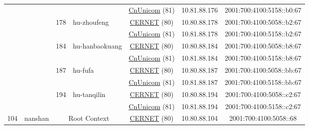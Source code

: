 \begin{small}
\begin{center}
\begin{longtable}{|c|c|c|c|c|c|c|c|}
  &  &  &  & \multicolumn{2}{|c|}{\tiny{\href{http://www.chinaunicom.com}{CnUnicom} (81)}} & \tiny{10.81.88.176} & \tiny{2001:700:4100:5158::b0:67} \\* \cline{3-3}\cline{4-4}\cline{5-5}\cline{6-6}\cline{7-7}\cline{8-8}
  &  & \multirow{2}{*}{\tiny{178}} & \multicolumn{1}{|l|}{\multirow{2}{*}{\tiny{hu-zhoufeng}}} & \multicolumn{2}{|c|}{\tiny{\href{http://www.cernet.edu.cn}{CERNET} (80)}} & \tiny{10.80.88.178} & \tiny{2001:700:4100:5058::b2:67} \\* \cline{5-5}\cline{6-6}\cline{7-7}\cline{8-8}
  &  &  &  & \multicolumn{2}{|c|}{\tiny{\href{http://www.chinaunicom.com}{CnUnicom} (81)}} & \tiny{10.81.88.178} & \tiny{2001:700:4100:5158::b2:67} \\* \cline{3-3}\cline{4-4}\cline{5-5}\cline{6-6}\cline{7-7}\cline{8-8}
  &  & \multirow{2}{*}{\tiny{184}} & \multicolumn{1}{|l|}{\multirow{2}{*}{\tiny{hu-hanbaokuang}}} & \multicolumn{2}{|c|}{\tiny{\href{http://www.cernet.edu.cn}{CERNET} (80)}} & \tiny{10.80.88.184} & \tiny{2001:700:4100:5058::b8:67} \\* \cline{5-5}\cline{6-6}\cline{7-7}\cline{8-8}
  &  &  &  & \multicolumn{2}{|c|}{\tiny{\href{http://www.chinaunicom.com}{CnUnicom} (81)}} & \tiny{10.81.88.184} & \tiny{2001:700:4100:5158::b8:67} \\* \cline{3-3}\cline{4-4}\cline{5-5}\cline{6-6}\cline{7-7}\cline{8-8}
  &  & \multirow{2}{*}{\tiny{187}} & \multicolumn{1}{|l|}{\multirow{2}{*}{\tiny{hu-fufa}}} & \multicolumn{2}{|c|}{\tiny{\href{http://www.cernet.edu.cn}{CERNET} (80)}} & \tiny{10.80.88.187} & \tiny{2001:700:4100:5058::bb:67} \\* \cline{5-5}\cline{6-6}\cline{7-7}\cline{8-8}
  &  &  &  & \multicolumn{2}{|c|}{\tiny{\href{http://www.chinaunicom.com}{CnUnicom} (81)}} & \tiny{10.81.88.187} & \tiny{2001:700:4100:5158::bb:67} \\* \cline{3-3}\cline{4-4}\cline{5-5}\cline{6-6}\cline{7-7}\cline{8-8}
  &  & \multirow{2}{*}{\tiny{194}} & \multicolumn{1}{|l|}{\multirow{2}{*}{\tiny{hu-tanqilin}}} & \multicolumn{2}{|c|}{\tiny{\href{http://www.cernet.edu.cn}{CERNET} (80)}} & \tiny{10.80.88.194} & \tiny{2001:700:4100:5058::c2:67} \\* \cline{5-5}\cline{6-6}\cline{7-7}\cline{8-8}
  &  &  &  & \multicolumn{2}{|c|}{\tiny{\href{http://www.chinaunicom.com}{CnUnicom} (81)}} & \tiny{10.81.88.194} & \tiny{2001:700:4100:5158::c2:67} \\ \hline
 \multirow{30}{*}{\tiny{104}} & \multicolumn{1}{|l|}{\multirow{30}{*}{\tiny{nanshan}}} & \multicolumn{2}{|c|}{\multirow{2}{*}{\tiny{Root Context}}} & \multicolumn{2}{|c|}{\tiny{\href{http://www.cernet.edu.cn}{CERNET} (80)}} & \tiny{10.80.88.104} & \tiny{2001:700:4100:5058::68} \\* \cline{5-5}\cline{6-6}\cline{7-7}\cline{8-8}

\end{longtable}
\end{center}
\end{small}
